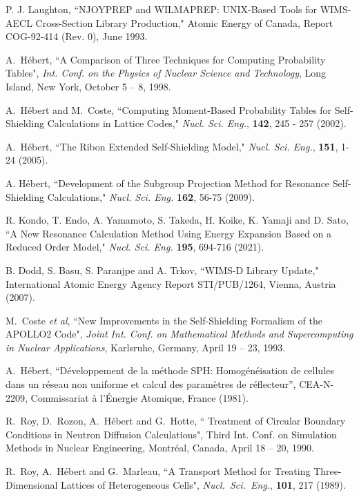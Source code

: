 \begin{thebibliography}{99}
P. J. Laughton, ``NJOYPREP and WILMAPREP: UNIX-Based Tools for WIMS-
AECL Cross-Section Library Production," Atomic Energy of Canada,
Report COG-92-414 (Rev. 0), June 1993.

A.~H\'ebert, ``A Comparison of Three Techniques for Computing Probability
Tables", {\sl Int. Conf. on the Physics of Nuclear Science and Technology},
Long Island, New York, October 5 -- 8, 1998.

A.~H\'ebert and M.~Coste, ``Computing Moment-Based Probability Tables for
Self-Shielding Calculations in Lattice Codes," {\sl Nucl. Sci. Eng.}, {\bf 142},
245 - 257 (2002).

A.~H\'ebert, ``The Ribon Extended Self-Shielding Model," {\sl Nucl. Sci. Eng.}, {\bf 151}, 1-24  (2005).

A. H\'ebert, ``Development of the Subgroup Projection Method for Resonance Self-Shielding Calculations," {\sl Nucl. Sci. Eng.} {\bf 162}, 56-75 (2009).

R. Kondo, T. Endo, A. Yamamoto, S. Takeda, H. Koike, K. Yamaji and D. Sato, ``A New Resonance Calculation Method Using Energy
Expansion Based on a Reduced Order Model," {\sl Nucl. Sci. Eng.} {\bf 195}, 694-716 (2021).

B. Dodd, S. Basu, S. Paranjpe and A. Trkov, ``WIMS-D Library Update," International Atomic Energy Agency
Report STI/PUB/1264, Vienna, Austria (2007).

M.~Coste {\sl et al}, ``New Improvements in the Self-Shielding Formalism of the APOLLO2
Code", {\sl Joint Int. Conf. on
Mathematical Methods and Supercomputing in Nuclear Applications}, Karlsruhe,
Germany, April 19 -- 23, 1993.

A.~H\'ebert, ``D\'eveloppement de la m\'ethode SPH: Homog\'en\'eisation de
cellules dans un r\'eseau non uniforme  et calcul des param\`etres de
r\'eflecteur'', CEA-N-2209, Commissariat \`a l'\'Energie Atomique, France (1981).

R.~Roy, D.~Rozon, A.~H\'ebert and G.~Hotte, `` Treatment of Circular Boundary
Conditions in Neutron Diffusion Calculations", Third Int. Conf. on Simulation
Methods in Nuclear Engineering, Montr\'eal, Canada, April 18 -- 20,
1990.

R.~Roy, A.~H\'ebert and G.~Marleau, ``A Transport Method for Treating
Three-Dimensional Lattices of Heterogeneous Cells", {\sl Nucl.~Sci.~Eng.}, {\bf
101}, 217 (1989).


\end{thebibliography}
